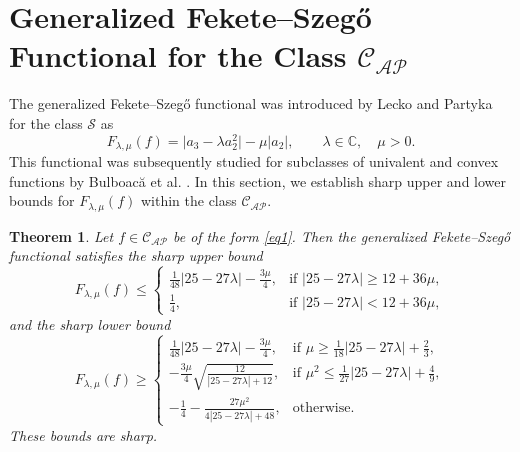 \documentclass[10pt,a4paper]{amsart}
\newtheorem{theo}{Theorem}[section]
\numberwithin{equation}{section}
\begin{document}
\section{Generalized Fekete--Szeg\H{o} Functional for the Class $\mathcal{C}_{\mathcal{AP}}$}
The generalized Fekete--Szeg\H{o} functional was introduced by Lecko and Partyka \cite{Lecko2024} for the class $\mathcal{S}$ as
\begin{equation}\label{FG}
F_{\lambda,\mu}(f) = \big|a_3-\lambda a_2^2\big| - \mu |a_2|, \qquad \lambda\in\mathbb{C}, \quad \mu>0.
\end{equation}
This functional was subsequently studied for subclasses of univalent and convex functions by Bulboac\u{a} et al. \cite{Bulboaca2025}. In this section, we establish sharp upper and lower bounds for $F_{\lambda,\mu}(f)$ within the class $\mathcal{C}_{\mathcal{AP}}$.


\begin{theo}\label{T4}
Let $f \in \mathcal{C}_{\mathcal{AP}}$ be of the form \eqref{eq1}. Then the generalized Fekete--Szeg\H{o} functional satisfies the sharp upper bound
\[
F_{\lambda,\mu}(f) \le 
\begin{cases}
\displaystyle \frac{1}{48} |25 - 27\lambda| - \frac{3\mu}{4}, & \text{if } \displaystyle |25 - 27\lambda| \ge 12 + 36\mu, \\[4mm]
\displaystyle \frac{1}{4}, & \text{if } \displaystyle |25 - 27\lambda| < 12 + 36\mu,
\end{cases}
\]
and the sharp lower bound
\[
F_{\lambda,\mu}(f) \ge 
\begin{cases}
\displaystyle \frac{1}{48} |25 - 27\lambda| - \frac{3\mu}{4}, & \text{if } \displaystyle \mu \ge \frac{1}{18} |25 - 27\lambda| + \frac{2}{3}, \\[4mm]
\displaystyle -\frac{3\mu}{4} \sqrt{ \frac{12}{|25 - 27\lambda| + 12} }, & \text{if } \displaystyle \mu^2 \le \frac{1}{27} |25 - 27\lambda| + \frac{4}{9}, \\[5mm]
\displaystyle -\frac{1}{4} - \frac{27\mu^2}{4 |25 - 27\lambda| + 48}, & \text{otherwise}.
\end{cases}
\]
These bounds are sharp.
\end{theo}
\end{document}
